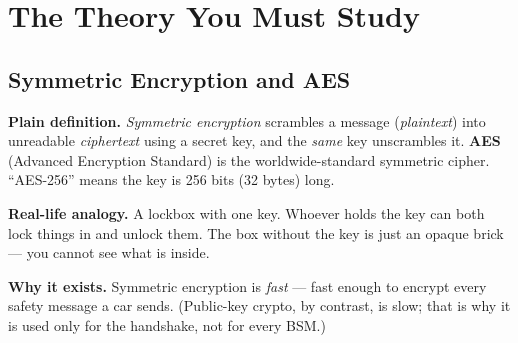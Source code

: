 \documentclass[11pt,a4paper]{report}
\begin{document}
\begin{center}
\end{center}

\section{The Theory You Must Study}

\subsection{Symmetric Encryption and AES}
\textbf{Plain definition.} \emph{Symmetric encryption} scrambles a message
(\emph{plaintext}) into unreadable \emph{ciphertext} using a secret key, and the
\emph{same} key unscrambles it. \textbf{AES} (Advanced Encryption Standard) is
the worldwide-standard symmetric cipher. ``AES-256'' means the key is 256 bits
(32 bytes) long.

\textbf{Real-life analogy.} A lockbox with one key. Whoever holds the key can
both lock things in and unlock them. The box without the key is just an opaque
brick --- you cannot see what is inside.

\textbf{Why it exists.} Symmetric encryption is \emph{fast} --- fast enough to
encrypt every safety message a car sends. (Public-key crypto, by contrast, is
slow; that is why it is used only for the handshake, not for every BSM.)
\end{document}
